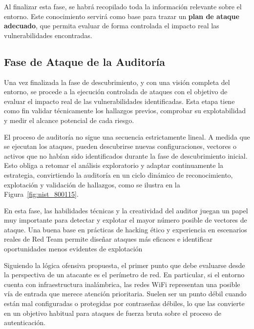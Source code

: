 \documentclass[a4paper, 11pt]{article}
\begin{document}
Al finalizar esta fase, se habrá recopilado toda la información relevante sobre el entorno. 
Este conocimiento servirá como base para trazar un \textbf{plan de ataque adecuado}, que 
permita evaluar de forma controlada el impacto real las vulnerabilidades encontradas.



\clearpage




\subsection{Fase de Ataque de la Auditoría}


Una vez finalizada la fase de descubrimiento, y con una visión completa del entorno, se procede a la ejecución controlada de ataques con el objetivo de evaluar el impacto real de las vulnerabilidades identificadas. Esta etapa tiene como fin validar técnicamente los hallazgos previos, comprobar su explotabilidad y medir el alcance potencial de cada riesgo.

El proceso de auditoría no sigue una secuencia estrictamente lineal. A medida que se ejecutan los ataques, pueden descubrirse nuevas configuraciones, vectores o activos que no habían sido identificados durante la fase de descubrimiento inicial. Esto obliga a retomar el análisis exploratorio y adaptar continuamente la estrategia, convirtiendo la auditoría en un ciclo dinámico de reconocimiento, explotación y validación de hallazgos, como se ilustra en la Figura~\ref{fig:nist_800115}.

En esta fase, las habilidades técnicas y la creatividad del auditor juegan un papel muy importante para detectar y explotar el mayor número posible de vectores de ataque. Una buena base en prácticas de hacking ético y experiencia en escenarios reales de Red Team permite diseñar ataques más eficaces e identificar oportunidades menos evidentes de explotación

Siguiendo la lógica ofensiva propuesta,  el primer punto que debe evaluarse desde la perspectiva de un atacante es el perímetro de red. En particular, si el entorno cuenta con infraestructura inalámbrica, las redes WiFi representan una posible vía de entrada que merece atención prioritaria. Suelen ser un punto débil cuando están mal configuradas o protegidas por contraseñas débiles, lo que las convierte en un objetivo habitual para ataques de fuerza bruta sobre el proceso de autenticación.

\end{document}
